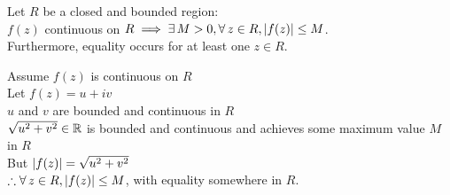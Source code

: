 \documentclass[letterpaper,12pt,fleqn]{article}
\begin{document}
\begin{theorem}
  Let $R$ be a closed and bounded region: \\
  $f(z)$ continuous on
  $R\implies\exists\,M>0,\forall\,z\in R,\lvert f(z)\rvert\le M$. \\
  Furthermore, equality occurs for at least one $z\in R$.
\end{theorem}
\newpage
\begin{theproof}
  Assume $f(z)$ is continuous on $R$ \\
  Let $f(z)=u+iv$ \\
  $u$ and $v$ are bounded and continuous in $R$ \\
  $\sqrt{u^2+v^2}\in\mathbb{R}$ is bounded and continuous and achieves some maximum
  value $M$ in $R$ \\
  But $\lvert f(z)\rvert=\sqrt{u^2+v^2}$ \\
  $\therefore \forall\,z\in R,\lvert f(z)\rvert\le M$, with equality somewhere in $R$.
\end{theproof}
\end{document}
